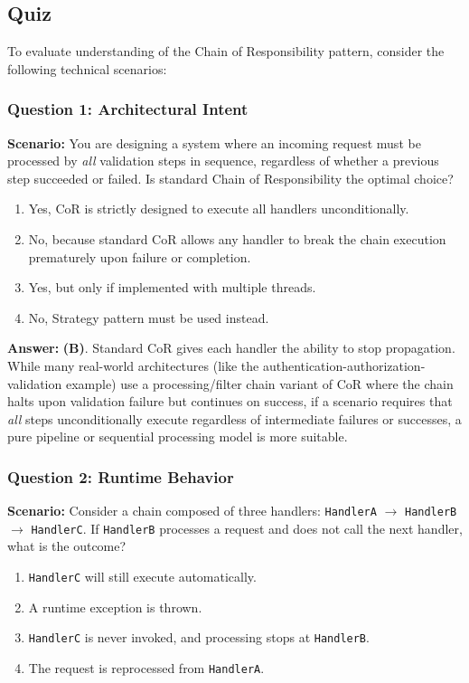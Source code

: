 \subsection{Quiz}

To evaluate understanding of the Chain of Responsibility pattern, consider the following technical scenarios:

\subsubsection*{Question 1: Architectural Intent}
\textbf{Scenario:} You are designing a system where an incoming request must be processed by \textit{all} validation steps in sequence, regardless of whether a previous step succeeded or failed. Is standard Chain of Responsibility the optimal choice?

\begin{enumerate}[label=(\Alph*)]
    \item Yes, CoR is strictly designed to execute all handlers unconditionally.
    \item No, because standard CoR allows any handler to break the chain execution prematurely upon failure or completion.
    \item Yes, but only if implemented with multiple threads.
    \item No, Strategy pattern must be used instead.
\end{enumerate}

\textbf{Answer:} \textbf{(B)}. Standard CoR gives each handler the ability to stop propagation. While many real-world architectures (like the authentication-authorization-validation example) use a processing/filter chain variant of CoR where the chain halts upon validation failure but continues on success, if a scenario requires that \textit{all} steps unconditionally execute regardless of intermediate failures or successes, a pure pipeline or sequential processing model is more suitable.

\subsubsection*{Question 2: Runtime Behavior}
\textbf{Scenario:} Consider a chain composed of three handlers: \texttt{HandlerA} $\rightarrow$ \texttt{HandlerB} $\rightarrow$ \texttt{HandlerC}. If \texttt{HandlerB} processes a request and does not call the next handler, what is the outcome?

\begin{enumerate}[label=(\Alph*)]
    \item \texttt{HandlerC} will still execute automatically.
    \item A runtime exception is thrown.
    \item \texttt{HandlerC} is never invoked, and processing stops at \texttt{HandlerB}.
    \item The request is reprocessed from \texttt{HandlerA}.
\end{enumerate}

